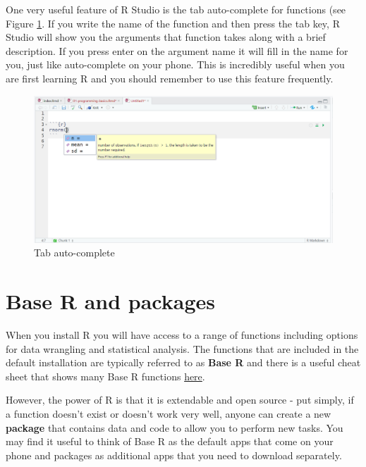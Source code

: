 \documentclass[]{book}
\begin{document}
One very useful feature of R Studio is the tab auto-complete for functions (see Figure \ref{fig:img-autocomplete}. If you write the name of the function and then press the tab key, R Studio will show you the arguments that function takes along with a brief description. If you press enter on the argument name it will fill in the name for you, just like auto-complete on your phone. This is incredibly useful when you are first learning R and you should remember to use this feature frequently.

\begin{figure}

{\centering \includegraphics[width=1\linewidth]{images/autocomplete} 

}

\caption{Tab auto-complete}\label{fig:img-autocomplete}
\end{figure}

\hypertarget{packages}{%
\section{Base R and packages}\label{packages}}

When you install R you will have access to a range of functions including options for data wrangling and statistical analysis. The functions that are included in the default installation are typically referred to as \textbf{Base R} and there is a useful cheat sheet that shows many Base R functions \href{https://www.rstudio.com/wp-content/uploads/2016/05/base-r.pdf}{here}.

However, the power of R is that it is extendable and open source - put simply, if a function doesn't exist or doesn't work very well, anyone can create a new \textbf{package} that contains data and code to allow you to perform new tasks. You may find it useful to think of Base R as the default apps that come on your phone and packages as additional apps that you need to download separately.
\end{document}

